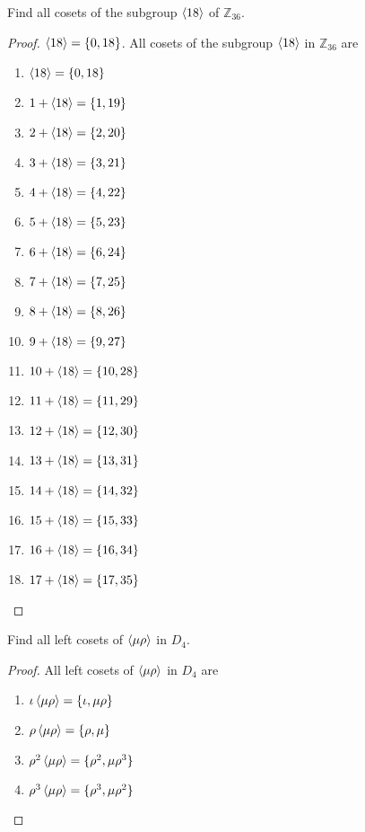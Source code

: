 \begin{exercise}
    Find all cosets of the subgroup $\left\langle{18}\right\rangle$ of $\mathbb{Z}_{36}$.
\end{exercise}

\begin{proof}
    $\left\langle{18}\right\rangle = \{ 0, 18 \}$. All cosets of the subgroup $\left\langle{18}\right\rangle$ in $\mathbb{Z}_{36}$ are
    \begin{enumerate}[label={(\arabic*)}]
        \item $\left\langle{18}\right\rangle = \{ 0, 18 \}$
        \item $1 + \left\langle{18}\right\rangle = \{ 1, 19 \}$
        \item $2 + \left\langle{18}\right\rangle = \{ 2, 20 \}$
        \item $3 + \left\langle{18}\right\rangle = \{ 3, 21 \}$
        \item $4 + \left\langle{18}\right\rangle = \{ 4, 22 \}$
        \item $5 + \left\langle{18}\right\rangle = \{ 5, 23 \}$
        \item $6 + \left\langle{18}\right\rangle = \{ 6, 24 \}$
        \item $7 + \left\langle{18}\right\rangle = \{ 7, 25 \}$
        \item $8 + \left\langle{18}\right\rangle = \{ 8, 26 \}$
        \item $9 + \left\langle{18}\right\rangle = \{ 9, 27 \}$
        \item $10 + \left\langle{18}\right\rangle = \{ 10, 28 \}$
        \item $11 + \left\langle{18}\right\rangle = \{ 11, 29 \}$
        \item $12 + \left\langle{18}\right\rangle = \{ 12, 30 \}$
        \item $13 + \left\langle{18}\right\rangle = \{ 13, 31 \}$
        \item $14 + \left\langle{18}\right\rangle = \{ 14, 32 \}$
        \item $15 + \left\langle{18}\right\rangle = \{ 15, 33 \}$
        \item $16 + \left\langle{18}\right\rangle = \{ 16, 34 \}$
        \item $17 + \left\langle{18}\right\rangle = \{ 17, 35 \}$
    \end{enumerate}
\end{proof}

\begin{exercise}
    Find all left cosets of $\left\langle{\mu\rho}\right\rangle$ in $D_{4}$.
\end{exercise}

\begin{proof}
    All left cosets of $\left\langle{\mu\rho}\right\rangle$ in $D_{4}$ are
    \begin{enumerate}[label={(\arabic*)}]
        \item $\iota\left\langle{\mu\rho}\right\rangle = \{ \iota, \mu\rho \}$
        \item $\rho\left\langle{\mu\rho}\right\rangle = \{ \rho, \mu \}$
        \item $\rho^{2}\left\langle{\mu\rho}\right\rangle = \{ \rho^{2}, \mu\rho^{3} \}$
        \item $\rho^{3}\left\langle{\mu\rho}\right\rangle = \{ \rho^{3}, \mu\rho^{2} \}$
    \end{enumerate}
\end{proof}

